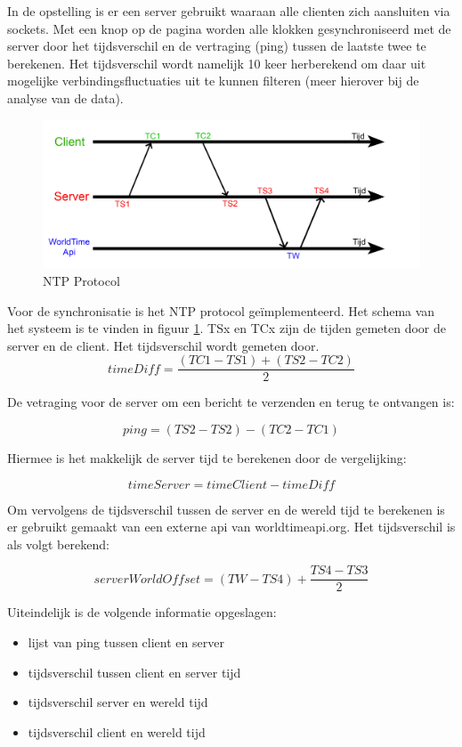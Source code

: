 In de opstelling is er een server gebruikt waaraan alle clienten zich aansluiten via sockets. Met een knop op de pagina worden alle klokken gesynchroniseerd met de server door het tijdsverschil en de vertraging (ping) tussen de laatste twee te berekenen.
Het tijdsverschil wordt namelijk 10 keer herberekend om daar uit mogelijke verbindingsfluctuaties uit te kunnen filteren (meer hierover bij de analyse van de data).

\begin{figure}[h]
\centering
\includegraphics[scale=0.4]{img/server-client-sync.jpg}
\caption{NTP Protocol} \label{serv-client}
\end{figure}

Voor de synchronisatie is het NTP protocol geïmplementeerd. 
Het schema van het systeem is te vinden in figuur \ref{serv-client}. TSx en TCx zijn de tijden gemeten door de server en de client.
Het tijdsverschil wordt gemeten door.
\newline
\[ timeDiff = \frac{(TC1 - TS1) + (TS2 - TC2)}{2}  \]

De vetraging voor de server om een bericht te verzenden en terug te ontvangen is:

\[ ping  = (TS2 - TS2) - (TC2 - TC1) \]


Hiermee is het makkelijk de server tijd te berekenen door de vergelijking:

\[ timeServer = timeClient - timeDiff \]

Om vervolgens de tijdsverschil tussen de server en de wereld tijd te berekenen is er gebruikt gemaakt van een externe api van worldtimeapi.org. Het tijdsverschil is als volgt berekend:

\[ serverWorldOffset = (TW - TS4) + \frac{TS4 - TS3}{2} \]

Uiteindelijk is de volgende informatie opgeslagen:

\begin{itemize}
  \item lijst van ping tussen client en server
  \item tijdsverschil tussen client en server tijd
  \item tijdsverschil server en wereld tijd
  \item tijdsverschil client en wereld tijd
\end{itemize}




